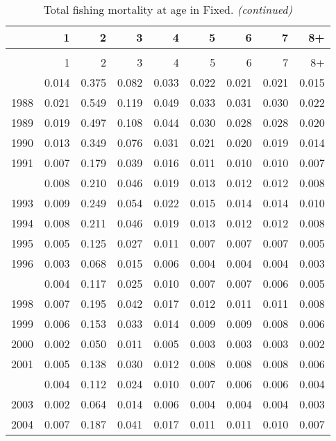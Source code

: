 \documentclass[
]{article}
\begin{document}
\begin{longtable}[t]{lrrrrrrrr}
\caption{\label{tab:Fixed-fleet-FAA-table}Total fishing mortality at age in Fixed.}\\
\toprule
  & 1 & 2 & 3 & 4 & 5 & 6 & 7 & 8+\\
\midrule
\endfirsthead
\caption[]{Total fishing mortality at age in Fixed. \textit{(continued)}}\\
\toprule
  & 1 & 2 & 3 & 4 & 5 & 6 & 7 & 8+\\
\midrule
\endhead

\endfoot
\bottomrule
\endlastfoot
1987 & 0.014 & 0.375 & 0.082 & 0.033 & 0.022 & 0.021 & 0.021 & 0.015\\
1988 & 0.021 & 0.549 & 0.119 & 0.049 & 0.033 & 0.031 & 0.030 & 0.022\\
1989 & 0.019 & 0.497 & 0.108 & 0.044 & 0.030 & 0.028 & 0.028 & 0.020\\
1990 & 0.013 & 0.349 & 0.076 & 0.031 & 0.021 & 0.020 & 0.019 & 0.014\\
1991 & 0.007 & 0.179 & 0.039 & 0.016 & 0.011 & 0.010 & 0.010 & 0.007\\
\addlinespace
1992 & 0.008 & 0.210 & 0.046 & 0.019 & 0.013 & 0.012 & 0.012 & 0.008\\
1993 & 0.009 & 0.249 & 0.054 & 0.022 & 0.015 & 0.014 & 0.014 & 0.010\\
1994 & 0.008 & 0.211 & 0.046 & 0.019 & 0.013 & 0.012 & 0.012 & 0.008\\
1995 & 0.005 & 0.125 & 0.027 & 0.011 & 0.007 & 0.007 & 0.007 & 0.005\\
1996 & 0.003 & 0.068 & 0.015 & 0.006 & 0.004 & 0.004 & 0.004 & 0.003\\
\addlinespace
1997 & 0.004 & 0.117 & 0.025 & 0.010 & 0.007 & 0.007 & 0.006 & 0.005\\
1998 & 0.007 & 0.195 & 0.042 & 0.017 & 0.012 & 0.011 & 0.011 & 0.008\\
1999 & 0.006 & 0.153 & 0.033 & 0.014 & 0.009 & 0.009 & 0.008 & 0.006\\
2000 & 0.002 & 0.050 & 0.011 & 0.005 & 0.003 & 0.003 & 0.003 & 0.002\\
2001 & 0.005 & 0.138 & 0.030 & 0.012 & 0.008 & 0.008 & 0.008 & 0.006\\
\addlinespace
2002 & 0.004 & 0.112 & 0.024 & 0.010 & 0.007 & 0.006 & 0.006 & 0.004\\
2003 & 0.002 & 0.064 & 0.014 & 0.006 & 0.004 & 0.004 & 0.004 & 0.003\\
2004 & 0.007 & 0.187 & 0.041 & 0.017 & 0.011 & 0.011 & 0.010 & 0.007\\

\end{longtable}
\end{document}
